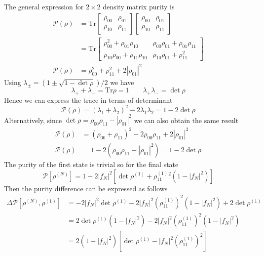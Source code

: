 \documentclass[../../../main.tex]{subfiles}
\begin{document}
The general expression for $2 \times 2$ density matrix purity is
\begin{align*}
  \mathcal{P}(\rho)
   & =
  \mathrm{Tr}
  \begin{bmatrix}
    \rho_{00} & \rho_{01} \\
    \rho_{10} & \rho_{11}
  \end{bmatrix}
  \begin{bmatrix}
    \rho_{00} & \rho_{01} \\
    \rho_{10} & \rho_{11}
  \end{bmatrix}
  \\
   & =
  \mathrm{Tr}
  \begin{bmatrix}
    \rho_{00}^2+\rho_{01}\rho_{10}
     &
    \rho_{00}\rho_{01}+\rho_{01}\rho_{11}
    \\
    \rho_{10}\rho_{00}+\rho_{11}\rho_{10}
     &
    \rho_{10}\rho_{01}+\rho_{11}^2
  \end{bmatrix}
  \\
  \mathcal{P}(\rho)
   & =
  \rho_{00}^2+\rho_{11}^2
  +2|\rho_{01}|^2
\end{align*}
Using $\lambda_\pm = (1\pm \sqrt{1- \det \rho})/2$ we have
\begin{equation*}
  \lambda_+ + \lambda_-  = \mathrm{Tr} \rho =1\qquad
  \lambda_+\lambda_- = \det \rho
\end{equation*}
Hence we can express the trace in terms of determinant
\begin{equation*}
  \mathcal{P}(\rho) = (\lambda_1+\lambda_2)^2-2\lambda_1\lambda_2 = 1-2\det\rho
\end{equation*}
Alternatively, since $\det \rho = \rho_{00}\rho_{11}-|\rho_{01}|^2$ we can also obtain the same result
\begin{align*}
  \mathcal{P}(\rho) & =  (\rho_{00}+\rho_{11})^2  - 2\rho_{00}\rho_{11} + 2|\rho_{01}|^2 \\
  \mathcal{P}(\rho) & =1-2\left(\rho_{00}\rho_{11}-|\rho_{01}|^2\right)=1-2\det\rho
\end{align*}
The purity of the first state is trivial so for the final state
\begin{equation*}
  \mathcal{P} [\rho^{(N)}] =
  1-  2 |f_N|^2[\det \rho^{(1)}+ \rho^{(1)}_{11}{}^2(1-|f_N|^2)]
\end{equation*}
Then the purity difference can be expressed as follows
\begin{align*}
  \Delta\mathcal{P}[\rho^{(N)},\rho^{(1)}]
   & =
  -2|f_N|^2\det\rho^{(1)}
  -2|f_N|^2(\rho_{11}^{(1)})^2(1-|f_N|^2)
  +2\det\rho^{(1)}
  \\
   & =
  2\det\rho^{(1)}(1-|f_N|^2)
  -2|f_N|^2(\rho_{11}^{(1)})^2(1-|f_N|^2)
  \\
   & =
  2(1-|f_N|^2)
  \left[
    \det\rho^{(1)}
    -|f_N|^2(\rho_{11}^{(1)})^2
    \right]
\end{align*}
\end{document}
